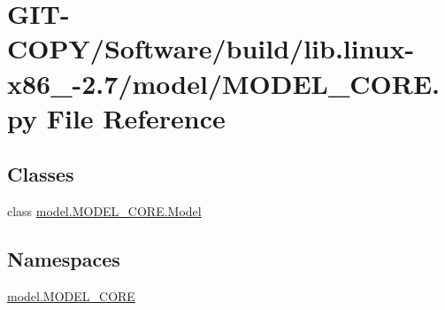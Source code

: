 \hypertarget{GIT-COPY_2Software_2build_2lib_8linux-x86__64-2_87_2model_2MODEL__CORE_8py}{}\section{G\+I\+T-\/\+C\+O\+P\+Y/\+Software/build/lib.linux-\/x86\+\_-\/2.7/model/\+M\+O\+D\+E\+L\+\_\+\+C\+O\+R\+E.py File Reference}
\label{GIT-COPY_2Software_2build_2lib_8linux-x86__64-2_87_2model_2MODEL__CORE_8py}
\subsection*{Classes}
\begin{DoxyCompactItemize}
\item 
class \hyperlink{classmodel_1_1MODEL__CORE_1_1Model}{model.\+M\+O\+D\+E\+L\+\_\+\+C\+O\+R\+E.\+Model}
\end{DoxyCompactItemize}
\subsection*{Namespaces}
\begin{DoxyCompactItemize}
\item 
 \hyperlink{namespacemodel_1_1MODEL__CORE}{model.\+M\+O\+D\+E\+L\+\_\+\+C\+O\+R\+E}
\end{DoxyCompactItemize}
